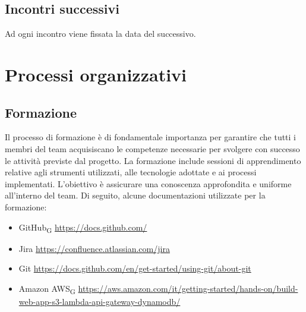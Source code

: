 \documentclass{article}
\begin{document}
\subsection{Incontri successivi}
Ad ogni incontro viene fissata la data del successivo.

\section{Processi organizzativi}
\subsection{Formazione}
Il processo di formazione è di fondamentale importanza per garantire che tutti i membri del team acquisiscano le competenze necessarie per svolgere con successo le attività previste dal progetto. La formazione include sessioni di apprendimento relative agli strumenti utilizzati, alle tecnologie adottate e ai processi implementati. L'obiettivo è assicurare una conoscenza approfondita e uniforme all'interno del team. Di seguito, alcune documentazioni utilizzate per la formazione:
\begin{itemize}
    \item GitHub\textsubscript{G} \href{https://docs.github.com/}{https://docs.github.com/}
    \item Jira \href{https://confluence.atlassian.com/jira}{https://confluence.atlassian.com/jira}
    \item Git \href{https://docs.github.com/en/get-started/using-git/about-git}{https://docs.github.com/en/get-started/using-git/about-git}
    \item Amazon AWS\textsubscript{G} \href{https://aws.amazon.com/it/getting-started/hands-on/build-web-app-s3-lambda-api-gateway-dynamodb/}{https://aws.amazon.com/it/getting-started/hands-on/build-web-app-s3-lambda-api-gateway-dynamodb/}
\end{itemize}
\end{document}
